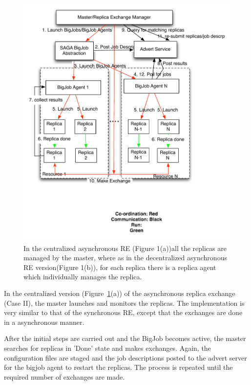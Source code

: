 \documentclass[a4paper,10pt]{article}
\begin{document}
\begin{figure}
\centering
\includegraphics[width=1\textwidth]{figures/cent_control.pdf}
\caption{\small In the centralized asynchronous RE (Figure 1(a))all the replicas are managed by the master, where as in the decentralized asynchronous RE version(Figure 1(b)), for each replica there is a replica agent which individually manages the replica.}
\label{fig:async}
\end{figure}

In the centralized version (Figure~\ref{fig:async}(a)) of the asynchronous replica exchange (Case II), the master launches and monitors the replicas. The implementation is very similar to that of the synchronous RE, except that the exchanges are done in a asynchronous manner. 

After the initial steps are carried out and the BigJob becomes active, the master searches for replicas in 'Done' state and makes exchanges. Again, the configuration files are staged and the job descriptions posted to the advert server for the bigjob agent to restart the replicas.%
The process is repeated until the required number of exchanges are made.
\end{document}
